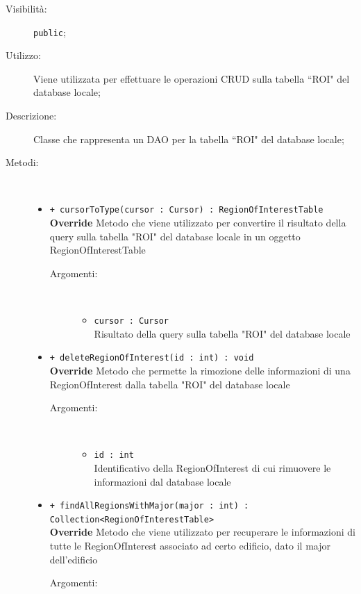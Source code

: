 \documentclass[../DefinizioneDiProdotto.tex]{subfiles}
\begin{document}
\begin{description}
\begin{itemize}
\end{itemize}
\item[Visibilità:] \texttt{public};
\item[Utilizzo:] Viene utilizzata per effettuare le operazioni CRUD sulla tabella “ROI" del database locale;
\item[Descrizione:] Classe che rappresenta un DAO per la tabella “ROI" del database locale;
\item[Metodi:] \
\begin{itemize}
\item \texttt{+ cursorToType(cursor : Cursor) : RegionOfInterestTable}\\
\textbf{Override} Metodo che viene utilizzato per convertire il risultato della query sulla tabella "ROI" del database locale in un oggetto RegionOfInterestTable
 \begin{description}
\item[Argomenti:] \
\begin{itemize}
\item \texttt{cursor : Cursor}\\
Risultato della query sulla tabella "ROI" del database locale\end{itemize}
\end{description}
\item \texttt{+ deleteRegionOfInterest(id : int) : void}\\
\textbf{Override} Metodo che permette la rimozione delle informazioni di una RegionOfInterest dalla tabella "ROI" del database locale
 \begin{description}
\item[Argomenti:] \
\begin{itemize}
\item \texttt{id : int}\\
Identificativo della RegionOfInterest di cui rimuovere le informazioni dal database locale\end{itemize}
\end{description}
\item \texttt{+ findAllRegionsWithMajor(major : int) :\\Collection<RegionOfInterestTable>}\\
\textbf{Override} Metodo che viene utilizzato per recuperare le informazioni di tutte le RegionOfInterest associato ad certo edificio, dato il major dell'edificio
 \begin{description}
\item[Argomenti:] \
\begin{itemize}

\end{itemize}
\end{description}
\end{itemize}
\end{description}
\end{document}
